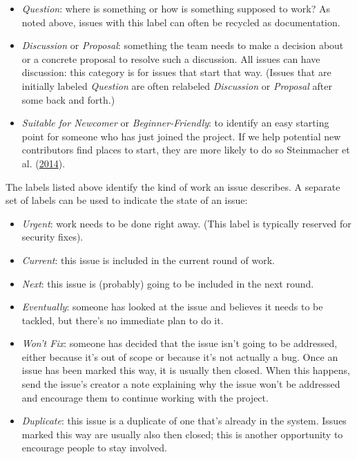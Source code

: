 \documentclass[
]{krantz}
\begin{document}
\begin{itemize}
\item
  \emph{Question}: where is something
  or how is something supposed to work?
  As noted above,
  issues with this label can often be recycled as documentation.
\item
  \emph{Discussion} or \emph{Proposal}: something the team needs to make a decision about
  or a concrete proposal to resolve such a discussion.
  All issues can have discussion:
  this category is for issues that start that way.
  (Issues that are initially labeled \emph{Question}
  are often relabeled \emph{Discussion} or \emph{Proposal}
  after some back and forth.)
\item
  \emph{Suitable for Newcomer} or \emph{Beginner-Friendly}:
  to identify an easy starting point for someone who has just joined the project.
  If we help potential new contributors find places to start,
  they are more likely to do so Steinmacher et al. (\protect\hyperlink{ref-Stei2014}{2014}).
\end{itemize}

The labels listed above identify the kind of work an issue describes.
A separate set of labels can be used to indicate the state of an issue:

\begin{itemize}
\item
  \emph{Urgent}: work needs to be done right away.
  (This label is typically reserved for security fixes).
\item
  \emph{Current}: this issue is included in the current round of work.
\item
  \emph{Next}: this issue is (probably) going to be included in the next round.
\item
  \emph{Eventually}: someone has looked at the issue and believes it needs to be tackled,
  but there's no immediate plan to do it.
\item
  \emph{Won't Fix}: someone has decided that the issue isn't going to be addressed,
  either because it's out of scope or because it's not actually a bug.
  Once an issue has been marked this way,
  it is usually then closed.
  When this happens,
  send the issue's creator a note explaining why the issue won't be addressed
  and encourage them to continue working with the project.
\item
  \emph{Duplicate}: this issue is a duplicate of one that's already in the system.
  Issues marked this way are usually also then closed;
  this is another opportunity to encourage people to stay involved.
\end{itemize}
\end{document}
